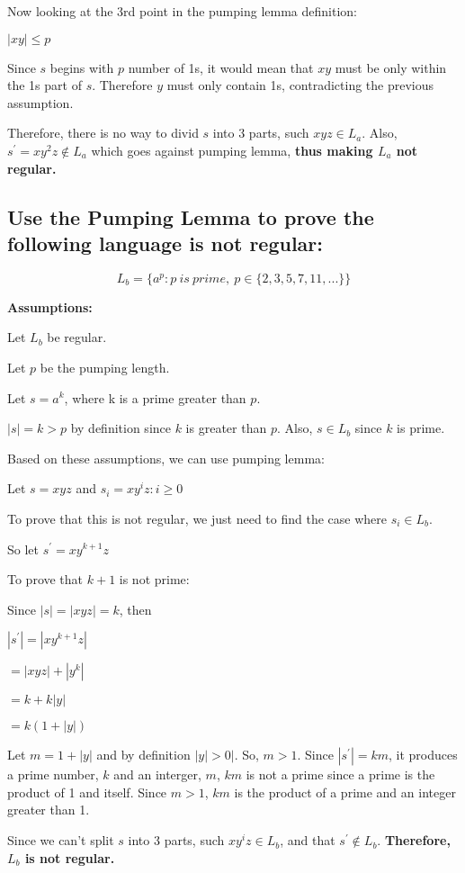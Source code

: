 \documentclass[12pt]{article}
\begin{document}
        Now looking at the 3rd point in the pumping lemma definition:

        \begin{center}
            $|xy| \leq p$

            Since $s$ begins with $p$ number of 1s, it would mean that $xy$ must be only within
            the 1s part of $s$. Therefore $y$ must only contain 1s, contradicting the previous assumption.
        \end{center}

        Therefore, there is no way to divid $s$ into 3 parts, such 
        $xyz \in L_a$. Also, $s^' = xy^2z \notin L_a$ which goes against 
        pumping lemma, \textbf{thus making $L_a$ not regular.}
        
    \pagebreak

    \subsection{Use the Pumping Lemma to prove the following language is not regular:}
        \[L_b = \{a^p : p \ is \ prime, \ p \in \{2,3,5,7,11,...\}\}\]

        \textbf{Assumptions:}
        \begin{center}
            Let $L_b$ be regular.

            Let $p$ be the pumping length.

            Let $s = a^k$, where k is a prime greater than $p$.

            $|s| = k > p$ by definition since $k$ is greater than $p$. Also, 
            $s \in L_b$ since $k$ is prime.
        \end{center}

        Based on these assumptions, we can use pumping lemma:

        \begin{center}
            Let $s = xyz$ and $s_i = xy^iz: i \geq 0$

            To prove that this is not regular, we just need to find the case 
            where $s_i \in L_b$.

            So let $s^' = xy^{k+1}z$
            
            To prove that $k+1$ is not prime:
            
            Since $|s| = |xyz| = k$, then
            
            $|s^'| = |xy^{k+1}z|$

            $= |xyz| + |y^k|$

            $= k + k|y|$
            
            $= k(1+|y|)$
        \end{center}

        Let $m = 1+|y|$ and by definition $|y| > 0|$. So, 
        $m > 1$. Since $|s^'| = km$, it produces a prime number, $k$ and 
        an interger, $m$, $km$ is not a prime since a prime is the product of 1 and itself.
        Since $m > 1$, $km$ is the product of a prime and an integer greater than 1.

        \medskip

        Since we can't split $s$ into 3 parts, such $xy^iz \in L_b$, and 
        that $s^' \notin L_b$. \textbf{Therefore, $L_b$ is not regular.}
\end{document}

